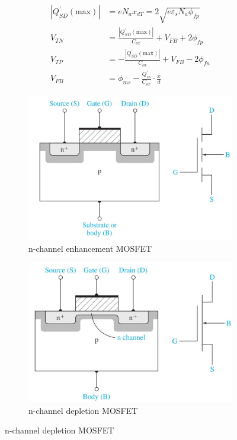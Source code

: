 \documentclass[a4paper, twocolumn]{article}
\begin{document}
    \begin{equation*}
        \boxed{
        \begin{aligned}
            \left| Q^\prime_{SD} (\text{max}) \right| &= eN_a x_{dT} = 2 \sqrt{e \varepsilon_s N_a \phi_{fp} } \\
            V_{TN} &= \frac{\left| Q^\prime_{SD} (\text{max}) \right|}{C_{ox} } + V_{FB} + 2 \phi_{fp}  \\
            V_{TP} &= - \frac{\left| Q^\prime_{SD} (\text{max}) \right|}{C_{ox} } + V_{FB} - 2 \phi_{fn}  \\
            V_{FB} &= \phi_{ms} - \frac{Q^\prime_{ss} }{C_{ox}}\cdot \frac{x}{d} 
        \end{aligned}
        }
    \end{equation*}
    
    \begin{figure}[H]
        \centering
        \begin{subfigure}[t]{0.45\linewidth}
            \centering
            \includegraphics[width=0.9\linewidth]{NMOS-enhancement.jpg}
            \caption{n-channel enhancement MOSFET}
            \label{subfig:NMOS-enhancement.jpg}
        \end{subfigure}
        \begin{subfigure}[t]{0.45\linewidth}
            \centering
            \includegraphics[width=0.9\linewidth]{NMOS-depletion.jpg}
            \caption{n-channel depletion MOSFET}
            \label{subfig:NMOS-depletion.jpg}
        \end{subfigure}
    \end{figure}
\end{document}
